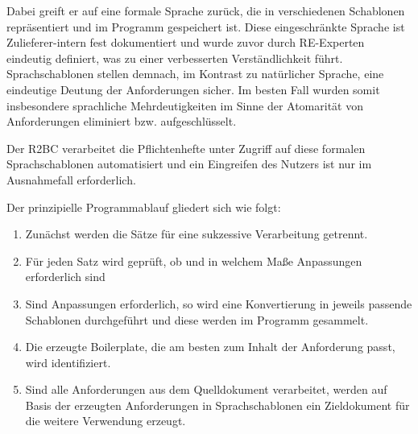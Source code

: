 \documentclass[12pt]{report}
\begin{document}
Dabei greift er auf eine formale Sprache zurück, die in verschiedenen Schablonen repräsentiert und im Programm gespeichert ist. Diese eingeschränkte Sprache ist Zulieferer-intern fest dokumentiert und wurde zuvor durch RE-Experten eindeutig definiert, was zu einer verbesserten Verständlichkeit führt. Sprachschablonen stellen demnach, im Kontrast zu natürlicher Sprache, eine eindeutige Deutung der Anforderungen sicher. Im besten Fall wurden somit insbesondere sprachliche Mehrdeutigkeiten im Sinne der Atomarität von Anforderungen eliminiert bzw. aufgeschlüsselt.

Der R2BC verarbeitet die Pflichtenhefte unter Zugriff auf diese formalen Sprachschablonen automatisiert und ein Eingreifen des Nutzers ist nur im Ausnahmefall erforderlich. 

Der prinzipielle Programmablauf gliedert sich wie folgt:
\begin{enumerate}
\item Zunächst werden die Sätze für eine sukzessive Verarbeitung getrennt.
\item Für jeden Satz wird geprüft, ob und in welchem Maße Anpassungen erforderlich sind
\item Sind Anpassungen erforderlich, so wird eine Konvertierung in jeweils passende Schablonen durchgeführt und diese werden im Programm gesammelt.
\item Die erzeugte Boilerplate, die am besten zum Inhalt der Anforderung passt, wird identifiziert.
\item Sind alle Anforderungen aus dem Quelldokument verarbeitet, werden auf Basis der erzeugten Anforderungen in Sprachschablonen ein Zieldokument für die weitere Verwendung erzeugt.
\end{enumerate}
\end{document}
